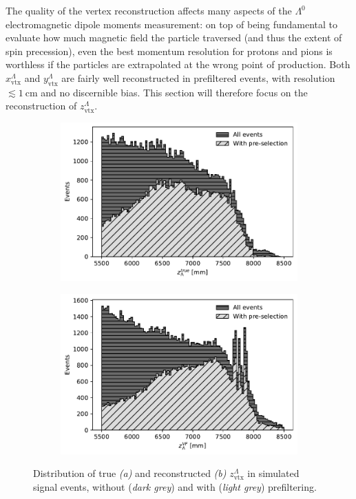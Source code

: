 The quality of the \lambdadecay vertex reconstruction affects many aspects of the $\Lambda^0$ electromagnetic dipole moments measurement:
on top of being fundamental to evaluate how much magnetic field the particle traversed (and thus the extent of spin precession), even the best momentum resolution for protons and pions is worthless if the particles are extrapolated at the wrong point of production.
Both $x_\text{vtx}^\Lambda$ and $y_\text{vtx}^\Lambda$ are fairly well reconstructed in prefiltered events, with resolution $\lesssim \SI{1}{\centi\meter}$ and no discernible bias.
This section will therefore focus on the reconstruction of $z_\text{vtx}^\Lambda$.

\begin{figure}[t]
	\centering
	\begin{subfigure}{.45\textwidth}
		\includegraphics[height=.2\textheight]{graphics/04-event_selection/Lambda_endvertex_z_true.pdf}
		\caption{}
		\label{fig:4:lz_vertex_true}
	\end{subfigure}
	\begin{subfigure}{.45\textwidth}
		\includegraphics[height=.2\textheight]{graphics/04-event_selection/Lambda_endvertex_z.pdf}
		\caption{}
		\label{fig:4:lz_vertex_reco}
	\end{subfigure}
	\caption{Distribution of true \textit{(a)} and reconstructed \textit{(b)} $z_\text{vtx}^\Lambda$ in simulated \demonstratorshort signal events, without (\textit{dark grey}) and with (\textit{light grey}) prefiltering.}
	\label{fig:4:lz_vertex_distributions}
\end{figure}

